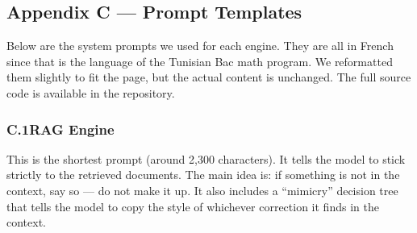 \subsection*{Appendix C — Prompt Templates}
\label{app:prompts}

Below are the system prompts we used for each engine. They are all in
French since that is the language of the Tunisian Bac math program. We
reformatted them slightly to fit the page, but the actual content is
unchanged. The full source code is available in the repository.

\subsubsection*{C.1\quad RAG Engine}
\label{app:prompt-rag}

This is the shortest prompt (around 2{,}300 characters). It tells the model
to stick strictly to the retrieved documents. The main idea is: if
something is not in the context, say so — do not make it up. It also
includes a ``mimicry'' decision tree that tells the model to copy the style
of whichever correction it finds in the context.


